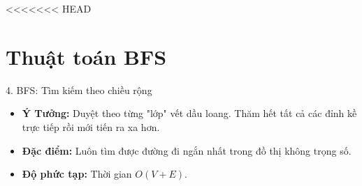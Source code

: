 <<<<<<< HEAD
\section{Thuật toán BFS}
\begin{frame}{4. BFS: Tìm kiếm theo chiều rộng}
    \begin{itemize}
        \item \textbf{Ý Tưởng:} Duyệt theo từng "lớp" vết dầu loang. Thăm hết tất cả các đỉnh kề trực tiếp rồi mới tiến ra xa hơn.
        \item \textbf{Đặc điểm:} Luôn tìm được đường đi ngắn nhất trong đồ thị không trọng số.
        \item \textbf{Độ phức tạp:} Thời gian $O(V + E)$.
    \end{itemize}
\end{frame}

